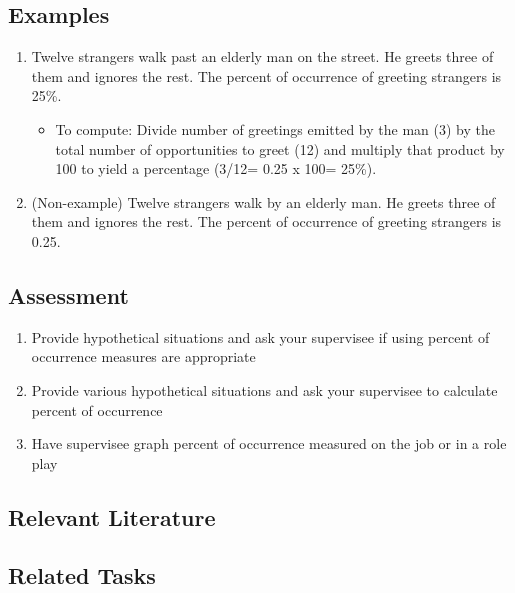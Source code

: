 \subsection{Examples}
\begin{enumerate}
\item  Twelve strangers walk past an elderly man on the street. He greets three of them and ignores the rest. The percent of occurrence of greeting strangers is 25\%.
\begin{itemize}
\item To compute: Divide number of greetings emitted by the man (3) by the total number of opportunities to greet (12) and multiply that product by 100 to yield a percentage (3/12= 0.25 x 100= 25\%).
\end{itemize}
\item (Non-example) Twelve strangers walk by an elderly man. He greets three of them and ignores the rest. The percent of occurrence of greeting strangers is 0.25. 
\end{enumerate}
%
\subsection{Assessment}
\begin{enumerate}
\item Provide hypothetical situations and ask your supervisee if using percent of occurrence measures are appropriate
\item Provide various hypothetical situations and ask your supervisee to calculate percent of occurrence
\item Have supervisee graph percent of occurrence measured on the job or in a role play
\end{enumerate}
%
\subsection{Relevant Literature}
\begin{refsection}
\nocite{test,alang2017police,clayton2018black}
\printbibliography[heading=none]
\end{refsection}
%
\subsection{Related Tasks}
\fouriOne{}\\
\fourhOne{}\\
\fourFKFourtySeven\\
%
%
%
%
%
%
